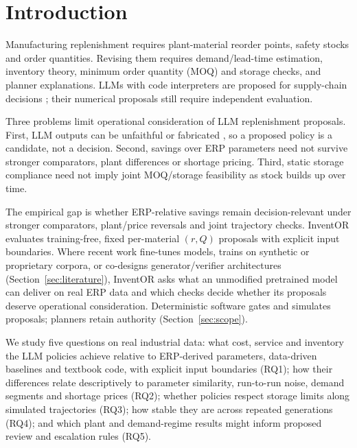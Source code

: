 \documentclass[preprint,12pt,nonatbib]{elsarticle}
\let\cite\parencite
\begin{document}
\section{Introduction}
\label{sec:intro}

Manufacturing replenishment requires plant-material reorder points, safety stocks and order quantities. Revising them requires demand/lead-time estimation, inventory theory, minimum order quantity (MOQ) and storage checks, and planner explanations. LLMs with code interpreters are proposed for supply-chain decisions \cite{jackson2024generative, fossowamba2023chatgpt, song2026llmscm}; their numerical proposals still require independent evaluation.

Three problems limit operational consideration of LLM replenishment proposals. First, LLM outputs can be unfaithful or fabricated \cite{ji2023survey}, so a proposed policy is a candidate, not a decision. Second, savings over ERP parameters need not survive stronger comparators, plant differences or shortage pricing. Third, static storage compliance need not imply joint MOQ/storage feasibility as stock builds up over time.

The empirical gap is whether ERP-relative savings remain decision-relevant under stronger comparators, plant/price reversals and joint trajectory checks. InventOR evaluates training-free, fixed per-material $(r,Q)$ proposals with explicit input boundaries. Where recent work fine-tunes models, trains on synthetic or proprietary corpora, or co-designs generator/verifier architectures (Section~\ref{sec:literature}), InventOR asks what an unmodified pretrained model can deliver on real ERP data and which checks decide whether its proposals deserve operational consideration. Deterministic software gates and simulates proposals; planners retain authority (Section~\ref{sec:scope}).

We study five questions on real industrial data: what cost, service and inventory the LLM policies achieve relative to ERP-derived parameters, data-driven baselines and textbook code, with explicit input boundaries (RQ1); how their differences relate descriptively to parameter similarity, run-to-run noise, demand segments and shortage prices (RQ2); whether policies respect storage limits along simulated trajectories (RQ3); how stable they are across repeated generations (RQ4); and which plant and demand-regime results might inform proposed review and escalation rules (RQ5).
\end{document}
